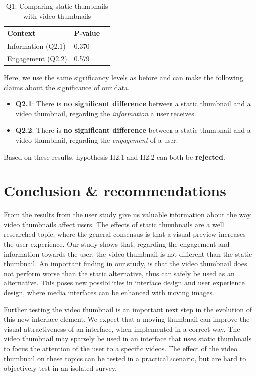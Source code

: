 \documentclass{../resources/sig-alternate-05-2015}
\begin{document}
\begin{table}[h]
\centering
\caption{Q1: Comparing static thumbnails with video thumbnails}
\label{q2 significance}
\begin{tabular}{@{}lll@{}}
\textbf{Context}   & \textbf{P-value} \\ \hline
Information (Q2.1) & \num{0.370}      \\
Engagement (Q2.2)  & \num{0.579}
\end{tabular}
\end{table}

Here, we use the same significancy levels as before and can make the following claims about the significance of our data.

\begin{itemize}
	\item \textbf{Q2.1}: There is \textbf{no significant difference} between a static thumbnail and a video thumbnail, regarding the \textit{information} a user receives.
	\item \textbf{Q2.2}: There is \textbf{no significant difference} between a static thumbnail and a video thumbnail, regarding the \textit{engagement} of a user.
\end{itemize}

Based on these results, hypothesis H2.1 and H2.2 can both be \textbf{rejected}.

\section{Conclusion \& recommendations}

From the results from the user study give us valuable information about the way video thumbnails affect users. The effects of static thumbnails are a well researched topic, where the general consensus is that a visual preview increases the user experience. Our study shows that, regarding the engagement and information towards the user, the video thumbnail is not different than the static thumbnail. An important finding in our study, is that the video thumbnail does not perform worse than the static alternative, thus can safely be used as an alternative. This poses new possibilities in interface design and user experience design, where media interfaces can be enhanced with moving images.

Further testing the video thumbnail is an important next step in the evolution of this new interface element. We expect that a moving thumbnail can improve the visual attractiveness of an interface, when implemented in a correct way. The video thumbnail may sparsely be used in an interface that uses static thumbnails to focus the attention of the user to a specific videos. The effect of the video thumbnail on these topics can be tested in a practical scenario, but are hard to objectively test in an isolated survey.
\end{document}

